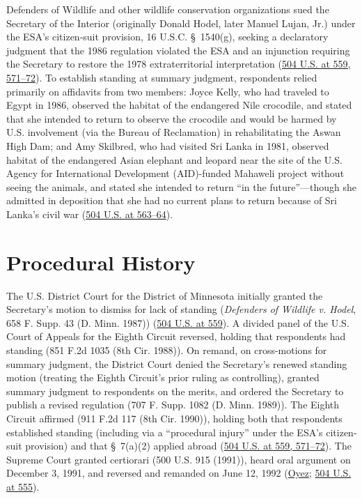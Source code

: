 \documentclass[12pt]{article}
\begin{document}
Defenders of Wildlife and other wildlife conservation organizations sued the Secretary of the Interior (originally Donald Hodel, later Manuel Lujan, Jr.) under the ESA's citizen-suit provision, 16 U.S.C. \S~1540(g), seeking a declaratory judgment that the 1986 regulation violated the ESA and an injunction requiring the Secretary to restore the 1978 extraterritorial interpretation (\href{https://supreme.justia.com/cases/federal/us/504/555/}{504 U.S. at 559, 571--72}). To establish standing at summary judgment, respondents relied primarily on affidavits from two members: Joyce Kelly, who had traveled to Egypt in 1986, observed the habitat of the endangered Nile crocodile, and stated that she intended to return to observe the crocodile and would be harmed by U.S. involvement (via the Bureau of Reclamation) in rehabilitating the Aswan High Dam; and Amy Skilbred, who had visited Sri Lanka in 1981, observed habitat of the endangered Asian elephant and leopard near the site of the U.S. Agency for International Development (AID)-funded Mahaweli project without seeing the animals, and stated she intended to return ``in the future''---though she admitted in deposition that she had no current plans to return because of Sri Lanka's civil war (\href{https://supreme.justia.com/cases/federal/us/504/555/}{504 U.S. at 563--64}).

\section{Procedural History}
The U.S. District Court for the District of Minnesota initially granted the Secretary's motion to dismiss for lack of standing (\textit{Defenders of Wildlife v. Hodel}, 658 F. Supp. 43 (D. Minn. 1987)) (\href{https://supreme.justia.com/cases/federal/us/504/555/}{504 U.S. at 559}). A divided panel of the U.S. Court of Appeals for the Eighth Circuit reversed, holding that respondents had standing (851 F.2d 1035 (8th Cir. 1988)). On remand, on cross-motions for summary judgment, the District Court denied the Secretary's renewed standing motion (treating the Eighth Circuit's prior ruling as controlling), granted summary judgment to respondents on the merits, and ordered the Secretary to publish a revised regulation (707 F. Supp. 1082 (D. Minn. 1989)). The Eighth Circuit affirmed (911 F.2d 117 (8th Cir. 1990)), holding both that respondents established standing (including via a ``procedural injury'' under the ESA's citizen-suit provision) and that \S~7(a)(2) applied abroad (\href{https://supreme.justia.com/cases/federal/us/504/555/}{504 U.S. at 559, 571--72}). The Supreme Court granted certiorari (500 U.S. 915 (1991)), heard oral argument on December 3, 1991, and reversed and remanded on June 12, 1992 (\href{https://www.oyez.org/cases/1991/90-1424}{Oyez}; \href{https://supreme.justia.com/cases/federal/us/504/555/}{504 U.S. at 555}).
\end{document}

